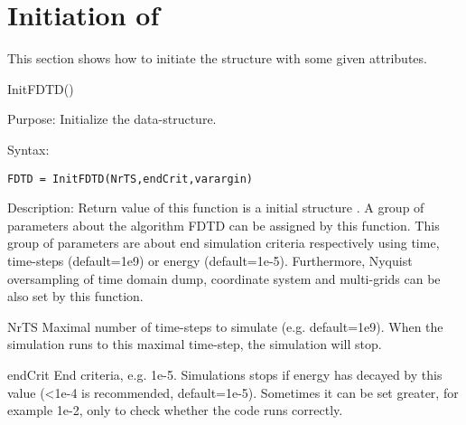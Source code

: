 \section{Initiation of } \label{sec:FDTD_ATTRIBUTE}
 \label{para:FDTD_ATTRIBUTE}
This section shows how to initiate the structure  with some given attributes.
 
\begin{FontNameFunct}{InitFDTD()}
 \label{func:InitFDTD}
\end{FontNameFunct}

\begin{FontDescr}{Purpose:}
Initialize the  data-structure.
\end{FontDescr}

\begin{FontDescr}{Syntax:}
      \begin{lstlisting}
FDTD = InitFDTD(NrTS,endCrit,varargin)
      \end{lstlisting}
\end{FontDescr}

\begin{FontDescr}{Description:}
Return value of this function is a initial structure . A group of parameters about the algorithm FDTD can be assigned by this function. This group of parameters are about end simulation criteria respectively using time, time-steps (default=1e9) or energy (default=1e-5). Furthermore, Nyquist oversampling of time domain dump, coordinate system and multi-grids \cite{EC_FDTD_CYL_THORSTEN} can be also set by this function.
    \begin{FontPara}{NrTS}  \label{para:NrTS}
    Maximal number of time-steps to simulate (e.g. default=1e9). When the simulation runs to this maximal time-step, the simulation will stop.
    \end{FontPara}
    \begin{FontPara}{endCrit}  \label{para:endCrit}
    End criteria, e.g. 1e-5. Simulations stops if energy has decayed by this value (<1e-4 is recommended, default=1e-5). Sometimes it can be set greater, for example 1e-2, only to check whether the code runs correctly.
    \end{FontPara}
\end{FontDescr}

